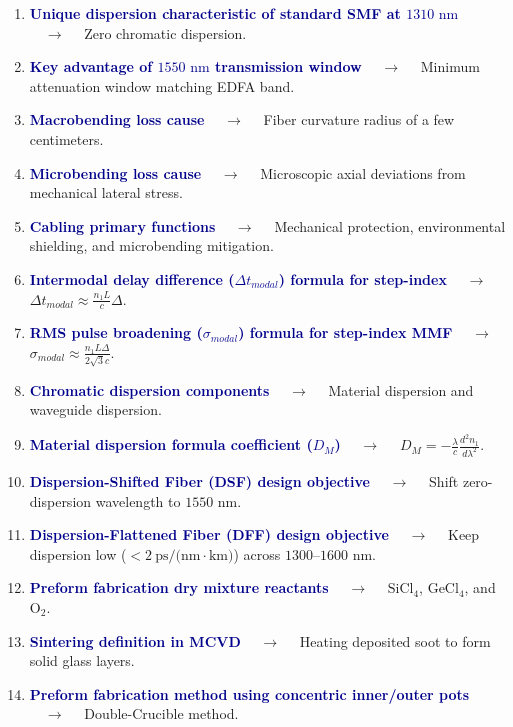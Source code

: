 \documentclass[11pt,a4paper]{article}
\begin{document}
\begin{enumerate}[label=\arabic*., leftmargin=*, labelsep=0.8em, itemsep=0.35em, parsep=0.1em, topsep=0.2em]
  \item \textcolor{darkblue}{\textbf{Unique dispersion characteristic of standard SMF at $1310\text{ nm}$}} $\quad\to\quad$ Zero chromatic dispersion.
  \item \textcolor{darkblue}{\textbf{Key advantage of $1550\text{ nm}$ transmission window}} $\quad\to\quad$ Minimum attenuation window matching EDFA band.
  \item \textcolor{darkblue}{\textbf{Macrobending loss cause}} $\quad\to\quad$ Fiber curvature radius of a few centimeters.
  \item \textcolor{darkblue}{\textbf{Microbending loss cause}} $\quad\to\quad$ Microscopic axial deviations from mechanical lateral stress.
  \item \textcolor{darkblue}{\textbf{Cabling primary functions}} $\quad\to\quad$ Mechanical protection, environmental shielding, and microbending mitigation.
  \item \textcolor{darkblue}{\textbf{Intermodal delay difference ($\Delta t_{modal}$) formula for step-index}} $\quad\to\quad$ $\Delta t_{modal} \approx \frac{n_1 L}{c} \Delta$.
  \item \textcolor{darkblue}{\textbf{RMS pulse broadening ($\sigma_{modal}$) formula for step-index MMF}} $\quad\to\quad$ $\sigma_{modal} \approx \frac{n_1 L \Delta}{2\sqrt{3}c}$.
  \item \textcolor{darkblue}{\textbf{Chromatic dispersion components}} $\quad\to\quad$ Material dispersion and waveguide dispersion.
  \item \textcolor{darkblue}{\textbf{Material dispersion formula coefficient ($D_M$)}} $\quad\to\quad$ $D_M = -\frac{\lambda}{c} \frac{d^2 n_1}{d\lambda^2}$.
  \item \textcolor{darkblue}{\textbf{Dispersion-Shifted Fiber (DSF) design objective}} $\quad\to\quad$ Shift zero-dispersion wavelength to $1550\text{ nm}$.
  \item \textcolor{darkblue}{\textbf{Dispersion-Flattened Fiber (DFF) design objective}} $\quad\to\quad$ Keep dispersion low ($< 2\ \text{ps/(nm}\cdot\text{km)}$) across $1300\text{--}1600\text{ nm}$.
  \item \textcolor{darkblue}{\textbf{Preform fabrication dry mixture reactants}} $\quad\to\quad$ $\text{SiCl}_4$, $\text{GeCl}_4$, and $\text{O}_2$.
  \item \textcolor{darkblue}{\textbf{Sintering definition in MCVD}} $\quad\to\quad$ Heating deposited soot to form solid glass layers.
  \item \textcolor{darkblue}{\textbf{Preform fabrication method using concentric inner/outer pots}} $\quad\to\quad$ Double-Crucible method.

\end{enumerate}
\end{document}
